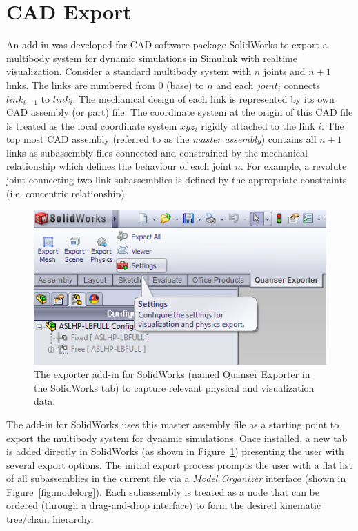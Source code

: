 \section{CAD Export} %
\label{sec:cad_export}

An add-in was developed for CAD software package SolidWorks to export a multibody system for dynamic simulations in Simulink with realtime visualization. Consider a standard multibody system with $n$ joints and $n + 1$ links. The links are numbered from 0 (base) to $n$ and each $joint_{i}$ connects $link_{i-1}$ to $link_{i}$. The mechanical design of each link is represented by its own CAD assembly (or part) file. The coordinate system at the origin of this CAD file is treated as the local coordinate system $xyz_{i}$ rigidly attached to the link $i$. The top most CAD assembly (referred to as the \emph{master assembly}) contains all $n + 1$ links as subassembly files connected and constrained by the mechanical relationship which defines the behaviour of each joint $n$. For example, a revolute joint connecting two link subassemblies is defined by the appropriate constraints (i.e. concentric relationship).

\begin{figure}[!h]
	\centering
    \includegraphics[scale=1.0]{fig/toolchain/exporter.png}
  	\caption{The exporter add-in for SolidWorks (named Quanser Exporter in the SolidWorks tab) to capture relevant physical and visualization data.}
	\label{fig:swexporter}
\end{figure}

The add-in for SolidWorks uses this master assembly file as a starting point to export the multibody system for dynamic simulations. Once installed, a new tab is added directly in SolidWorks (as shown in Figure~\ref{fig:swexporter}) presenting the user with several export options. The initial export process prompts the user with a flat list of all subassemblies in the current file via a \emph{Model Organizer} interface (shown in Figure~\ref{fig:modelorg}). Each subassembly is treated as a node that can be ordered (through a drag-and-drop interface) to form the desired kinematic tree/chain hierarchy. 


